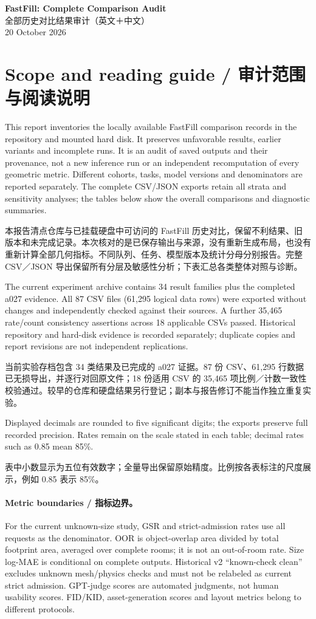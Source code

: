 \documentclass[10pt,a4paper,fontset=fandol]{ctexart}
\begin{document}
\begin{center}
{\Large\bfseries FastFill: Complete Comparison Audit}\\[4pt]
{\large 全部历史对比结果审计（英文＋中文）}\\[4pt]
20 October 2026
\end{center}
\section*{Scope and reading guide / 审计范围与阅读说明}
This report inventories the locally available FastFill comparison records in the repository and mounted hard disk. It preserves unfavorable results, earlier variants and incomplete runs. It is an audit of saved outputs and their provenance, not a new inference run or an independent recomputation of every geometric metric. Different cohorts, tasks, model versions and denominators are reported separately. The complete CSV/JSON exports retain all strata and sensitivity analyses; the tables below show the overall comparisons and diagnostic summaries.

本报告清点仓库与已挂载硬盘中可访问的 FastFill 历史对比，保留不利结果、旧版本和未完成记录。本次核对的是已保存输出与来源，没有重新生成布局，也没有重新计算全部几何指标。不同队列、任务、模型版本及统计分母分别报告。完整 CSV／JSON 导出保留所有分层及敏感性分析；下表汇总各类整体对照与诊断。

The current experiment archive contains 34 result families plus the completed a027 evidence. All 87 CSV files (61,295 logical data rows) were exported without changes and independently checked against their sources. A further 35,465 rate/count consistency assertions across 18 applicable CSVs passed. Historical repository and hard-disk evidence is recorded separately; duplicate copies and report revisions are not independent replications.

当前实验存档包含 34 类结果及已完成的 a027 证据。87 份 CSV、61,295 行数据已无损导出，并逐行对回原文件；18 份适用 CSV 的 35,465 项比例／计数一致性校验通过。较早的仓库和硬盘结果另行登记；副本与报告修订不能当作独立重复实验。

Displayed decimals are rounded to five significant digits; the exports preserve full recorded precision. Rates remain on the scale stated in each table; decimal rates such as 0.85 mean 85\%.

表中小数显示为五位有效数字；全量导出保留原始精度。比例按各表标注的尺度展示，例如 0.85 表示 85\%。

\paragraph{Metric boundaries / 指标边界。}
For the current unknown-size study, GSR and strict-admission rates use all requests as the denominator. OOR is object-overlap area divided by total footprint area, averaged over complete rooms; it is not an out-of-room rate. Size log-MAE is conditional on complete outputs. Historical v2 ``known-check clean'' excludes unknown mesh/physics checks and must not be relabeled as current strict admission. GPT-judge scores are automated judgments, not human usability scores. FID/KID, asset-generation scores and layout metrics belong to different protocols.
\end{document}
